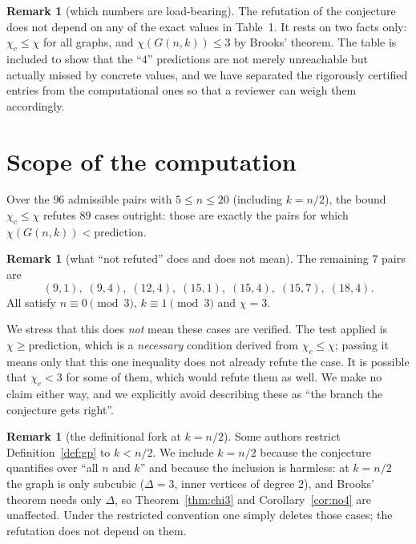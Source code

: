 \documentclass[11pt]{article}
\theoremstyle{definition}
\newtheorem{remark}[theorem]{Remark}
\newcommand{\chic}{\chi_c}
\newcommand{\Gn}{G(n,k)}
\begin{document}
\begin{remark}[which numbers are load-bearing]
The refutation of the conjecture does not depend on any of the exact values in
Table~1. It rests on two facts only: $\chic \le \chi$ for all graphs, and
$\chi(\Gn) \le 3$ by Brooks' theorem. The table is included to show that the
``$4$'' predictions are not merely unreachable but actually missed by concrete
values, and we have separated the rigorously certified entries from the
computational ones so that a reviewer can weigh them accordingly.
\end{remark}

\section{Scope of the computation}

Over the $96$ admissible pairs with $5 \le n \le 20$ (including $k = n/2$),
the bound $\chic \le \chi$ refutes $89$ cases outright: those are exactly the
pairs for which $\chi(\Gn) < \text{prediction}$.

\begin{remark}[what ``not refuted'' does and does not mean]\label{rem:survivors}
The remaining $7$ pairs are
\[
(9,1),\;(9,4),\;(12,4),\;(15,1),\;(15,4),\;(15,7),\;(18,4).
\]
All satisfy $n \equiv 0 \pmod 3$, $k \equiv 1 \pmod 3$ and $\chi = 3$.

We stress that this does \emph{not} mean these cases are verified. The test
applied is $\chi \ge \text{prediction}$, which is a \emph{necessary} condition
derived from $\chic \le \chi$; passing it means only that this one inequality
does not already refute the case. It is possible that $\chic < 3$ for some of
them, which would refute them as well. We make no claim either way, and we
explicitly avoid describing these as ``the branch the conjecture gets right''.
\end{remark}

\begin{remark}[the definitional fork at $k = n/2$]
Some authors restrict Definition~\ref{def:gp} to $k < n/2$. We include
$k = n/2$ because the conjecture quantifies over ``all $n$ and $k$'' and
because the inclusion is harmless: at $k = n/2$ the graph is only subcubic
($\Delta = 3$, inner vertices of degree $2$), and Brooks' theorem needs only
$\Delta$, so Theorem~\ref{thm:chi3} and Corollary~\ref{cor:no4} are unaffected.
Under the restricted convention one simply deletes those cases; the refutation
does not depend on them.
\end{remark}
\end{document}
